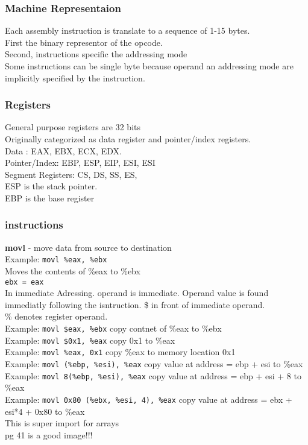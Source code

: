 \documentclass[answers,12pt,addpoints]{exam}
\begin{document}
\subsubsection{Machine Representaion}
Each assembly instruction is translate to a sequence of 1-15 bytes. \\
First the binary representor of the opcode. \\
Second, instructions specific the addressing mode\\
Some instructions can be single byte because operand an addressing mode are implicitly specified by the instruction. \\
\subsubsection{Registers}
General purpose registers are 32 bits\\
Originally categorized as data register and pointer/index registers. \\
Data : EAX, EBX, ECX, EDX. \\
Pointer/Index: EBP, ESP, EIP, ESI, ESI \\
Segment Registers: CS, DS, SS, ES, \\
ESP is the stack pointer. \\
EBP is the base register 
\subsubsection{instructions}
\textbf{movl} - move data from source to destination \\
Example: \texttt{movl \%eax, \%ebx} \\
Moves the contents of \%eax to \%ebx \\
\texttt{ebx = eax} \\
In immediate Adressing. operand is immediate. Operand value is found immediatly following the isntruction. \$ in front of immediate operand. \\
\% denotes register operand. \\
Example: \texttt{movl \$eax, \%ebx}  copy contnet of \%eax to \%ebx \\
Example: \texttt{movl \$0x1, \%eax} copy 0x1 to \%eax \\
Example: \texttt{movl \%eax, 0x1} copy \%eax to memory location 0x1 \\
Example: \texttt{movl (\%ebp, \%esi), \%eax} copy value at address = ebp + esi to \%eax \\
Example: \texttt{movl 8(\%ebp, \%esi), \%eax} copy value at address = ebp + esi + 8 to \%eax \\
Example: \texttt{movl 0x80 (\%ebx, \%esi, 4), \%eax} copy value at address = ebx + esi*4 + 0x80 to \%eax \\
This is super import for arrays \\
pg 41 is a good image!!!\\
\end{document}

